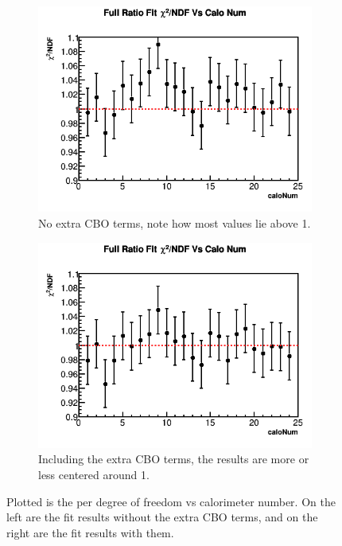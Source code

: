 	\begin{figure}[]
	\centering
	    \begin{subfigure}[t]{0.45\textwidth}
		    \centering
			\includegraphics[width=\textwidth]{PoorCaloFits}
		    \caption{No extra CBO terms, note how most values lie above 1.}
	    \end{subfigure}
	    \hspace{4mm}
	    \begin{subfigure}[t]{0.45\textwidth}
		    \centering
			\includegraphics[width=\textwidth]{RatioCBOFit_Chi2NDF_Vs_Calo_Canv}
		    \caption{Including the extra CBO terms, the results are more or less centered around 1.}
	    \end{subfigure}
	\caption[CaloChi2s]{Plotted is the \chisq per degree of freedom vs calorimeter number. On the left are the fit results without the extra CBO terms, and on the right are the fit results with them.}
	\label{fig:CaloChi2s}
	\end{figure}


